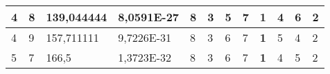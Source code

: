 \documentclass[conference]{IEEEtran}
\begin{document}
\begin{table*}[]
\begin{tabular}{|llll|llllllll|}
\multicolumn{1}{|l|}{4}                                                     & \multicolumn{1}{l|}{8}                                                        & \multicolumn{1}{l|}{139,044444}                                                   & 8,0591E-27                     & \multicolumn{1}{l|}{8}                                                  & \multicolumn{1}{l|}{3}                                                  & \multicolumn{1}{l|}{5}                                                  & \multicolumn{1}{l|}{7}                                                  & \multicolumn{1}{l|}{\textbf{1}}                                         & \multicolumn{1}{l|}{4}                                                  & \multicolumn{1}{l|}{6}                                                  & 2                          \\ \hline
\multicolumn{1}{|l|}{4}                                                     & \multicolumn{1}{l|}{9}                                                        & \multicolumn{1}{l|}{157,711111}                                                   & 9,7226E-31                     & \multicolumn{1}{l|}{8}                                                  & \multicolumn{1}{l|}{3}                                                  & \multicolumn{1}{l|}{6}                                                  & \multicolumn{1}{l|}{7}                                                  & \multicolumn{1}{l|}{\textbf{1}}                                         & \multicolumn{1}{l|}{5}                                                  & \multicolumn{1}{l|}{4}                                                  & 2                          \\ \hline
\multicolumn{1}{|l|}{5}                                                     & \multicolumn{1}{l|}{7}                                                        & \multicolumn{1}{l|}{166,5}                                                        & 1,3723E-32                     & \multicolumn{1}{l|}{8}                                                  & \multicolumn{1}{l|}{3}                                                  & \multicolumn{1}{l|}{6}                                                  & \multicolumn{1}{l|}{7}                                                  & \multicolumn{1}{l|}{\textbf{1}}                                         & \multicolumn{1}{l|}{4}                                                  & \multicolumn{1}{l|}{5}                                                  & 2                          \\ \hline

\end{tabular}
\end{table*}
\end{document}
